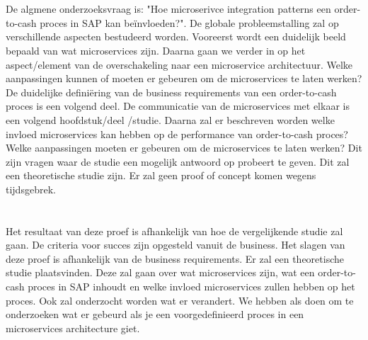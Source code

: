 \section{}
\label{sec:onderzoeksvraag}
De algmene onderzoeksvraag is: "Hoe microserivce integration patterns een order-to-cash proces in SAP kan beïnvloeden?". De globale probleemstalling zal op verschillende aspecten bestudeerd worden. Vooreerst wordt een duidelijk beeld bepaald van wat microservices zijn. Daarna gaan we verder in op het aspect/element van de overschakeling naar een microservice architectuur. Welke aanpassingen kunnen of moeten er gebeuren om de microservices te laten werken? 
De duidelijke definiëring van de business requirements van een order-to-cash proces is een volgend deel.
De communicatie van de microservices met elkaar is een volgend hoofdstuk/deel /studie. Daarna zal er beschreven worden welke invloed  microservices kan hebben op de performance van order-to-cash proces? Welke aanpassingen moeten er gebeuren om de microservices te laten werken? Dit zijn vragen waar de studie een mogelijk antwoord op probeert te geven. Dit zal een theoretische studie zijn. Er zal geen proof of concept komen wegens tijdsgebrek. 

\section{}
\label{sec:onderzoeksdoelstelling}
Het resultaat van deze proef is afhankelijk van hoe de vergelijkende studie zal gaan. De criteria voor succes zijn opgesteld vanuit de business. Het slagen van deze proef is afhankelijk van de business requirements. Er zal een theoretische studie plaatsvinden. Deze zal gaan over wat microservices zijn, wat een order-to-cash proces in SAP inhoudt en welke invloed microservices zullen hebben op het proces. Ook zal onderzocht worden wat er verandert. We hebben als doen om te onderzoeken wat er gebeurd als je een voorgedefinieerd proces in een microservices architecture giet.

\section{}
\label{sec:opzet-bachelorproef}


